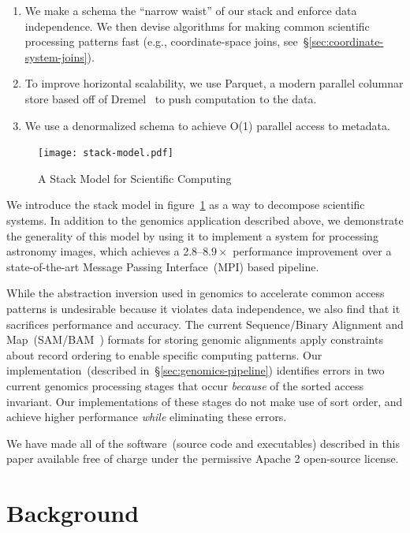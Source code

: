 \documentclass{acm_proc_article-sp}
\begin{document}
\begin{enumerate}
\item We make a schema the ``narrow waist'' of our stack and enforce data independence. We then
devise algorithms for making common scientific processing patterns fast (e.g., coordinate-space joins,
see~\S\ref{sec:coordinate-system-joins}).
\item To improve horizontal scalability, we use Parquet, a modern parallel columnar store based off of
Dremel~\cite{melnik10} to push computation to the data.
\item We use a denormalized schema to achieve O(1) parallel access to metadata.
\end{enumerate}

\begin{figure}[h]
\begin{center}
\texttt{[image: stack-model.pdf]}
\end{center}
\caption{A Stack Model for Scientific Computing}
\label{fig:stack-model}
\end{figure}

We introduce the stack model in figure~\ref{fig:stack-model} as a way to decompose scientific systems. In
addition to the genomics application described above, we demonstrate the generality of this model by using it to
implement a system for processing astronomy images, which achieves a 2.8--$8.9\times$ performance
improvement over a state-of-the-art Message Passing Interface~(MPI) based pipeline.

While the abstraction inversion used in genomics to accelerate common access patterns is undesirable
because it violates data independence, we also find that it sacrifices performance and
accuracy. The current Sequence/Binary Alignment and Map~(SAM/BAM~\cite{li09}) formats for storing
genomic alignments apply constraints about record ordering to enable specific computing patterns. Our
implementation~(described in~\S\ref{sec:genomics-pipeline}) identifies errors in two current genomics
processing stages that occur \emph{because} of the sorted access invariant. Our implementations of
these stages do not make use of sort order, and achieve higher performance \emph{while} eliminating
these errors.

We have made all of the software~(source code and executables) described in this paper available free
of charge under the permissive Apache 2 open-source license.

\section{Background}
\label{sec:background}
\end{document}
